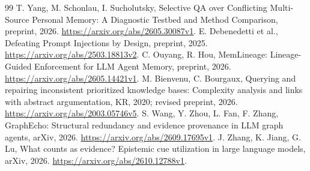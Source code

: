 \documentclass[a4paper,preprint,12pt,numbers,nopreprintline]{elsarticle}
\begin{document}
\begin{thebibliography}{99}
 T. Yang, M. Schonlau, I. Sucholutsky, Selective QA over Conflicting Multi-Source Personal Memory: A Diagnostic Testbed and Method Comparison, preprint, 2026. \url{https://arxiv.org/abs/2605.30087v1}.
 E. Debenedetti et al., Defeating Prompt Injections by Design, preprint, 2025. \url{https://arxiv.org/abs/2503.18813v2}.
 C. Ouyang, R. Hou, MemLineage: Lineage-Guided Enforcement for LLM Agent Memory, preprint, 2026. \url{https://arxiv.org/abs/2605.14421v1}.
 M. Bienvenu, C. Bourgaux, Querying and repairing inconsistent prioritized knowledge bases: Complexity analysis and links with abstract argumentation, KR, 2020; revised preprint, 2026. \url{https://arxiv.org/abs/2003.05746v5}.
 S. Wang, Y. Zhou, L. Fan, F. Zhang, GraphEcho: Structural redundancy and evidence provenance in LLM graph agents, arXiv, 2026. \url{https://arxiv.org/abs/2609.17695v1}.
 J. Zhang, K. Jiang, G. Lu, What counts as evidence? Epistemic cue utilization in large language models, arXiv, 2026. \url{https://arxiv.org/abs/2610.12788v1}.
\end{thebibliography}
\end{document}
